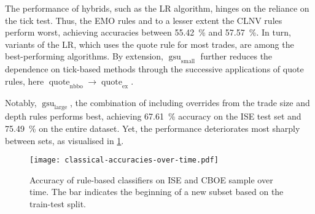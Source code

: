 The performance of hybrids, such as the \gls{LR} algorithm, hinges on the reliance on the tick test. Thus, the \gls{EMO} rules and to a lesser extent the \gls{CLNV} rules perform worst, achieving accuracies between \SI{55.42}{\percent} and \SI{57.57}{\percent}. In turn, variants of the \gls{LR}, which uses the quote rule for most trades, are among the best-performing algorithms. By extension, $\operatorname{gsu}_{\mathrm{small}}$ further reduces the dependence on tick-based methods through the successive applications of quote rules, here $\operatorname{quote}_{\mathrm{nbbo}} \to \operatorname{quote}_{\mathrm{ex}}$.

Notably, $\operatorname{gsu}_{\mathrm{large}}$, the combination of \textcite[][33]{grauerOptionTradeClassification2022} including overrides from the trade size and depth rules performs best, achieving \SI{67.61}{\percent} accuracy on the \gls{ISE} test set and \SI{75.49}{\percent} on the entire dataset. Yet, the performance deteriorates most sharply between sets, as visualised in \cref{fig:classical-accuracies-over-time}.

\begin{figure}[ht]
    \centering
    \texttt{[image: classical-accuracies-over-time.pdf]}
    \caption[Accuracy of Rule-Based Classifiers Over Time]{Accuracy of rule-based classifiers on \gls{ISE} and \gls{CBOE} sample over time. The bar \myline{} indicates the beginning of a new subset based on the train-test split.}
    \label{fig:classical-accuracies-over-time}
\end{figure}

